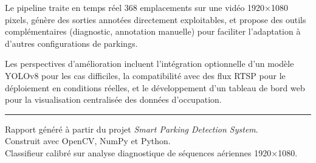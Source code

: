 \documentclass[12pt,a4paper]{report}
\begin{document}
Le pipeline traite en temps réel 368 emplacements sur une vidéo 1920×1080 pixels, génère des sorties annotées directement exploitables, et propose des outils complémentaires (diagnostic, annotation manuelle) pour faciliter l'adaptation à d'autres configurations de parkings.

Les perspectives d'amélioration incluent l'intégration optionnelle d'un modèle YOLOv8 pour les cas difficiles, la compatibilité avec des flux RTSP pour le déploiement en conditions réelles, et le développement d'un tableau de bord web pour la visualisation centralisée des données d'occupation.

\vspace{1cm}
\noindent\rule{\linewidth}{0.4pt}
\begin{center}
  {\small Rapport généré à partir du projet \textit{Smart Parking Detection System}.\\
  Construit avec OpenCV, NumPy et Python.\\
  Classifieur calibré sur analyse diagnostique de séquences aériennes 1920×1080.}
\end{center}
\end{document}
